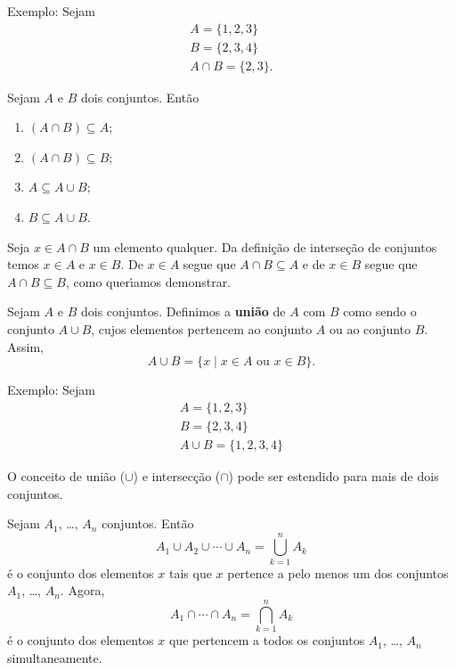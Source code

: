 Exemplo: Sejam
\begin{align*}
	A = \{1,2,3\}\\
	B = \{2,3,4\}\\
	A \cap B = \{2,3\}.
\end{align*}

\begin{proposicao} Sejam $A$ e $B$ dois conjuntos. Ent{\~a}o
\begin{enumerate}
\item $(A \cap B) \subseteq A$;
\item $(A \cap B) \subseteq B$;
\item $A \subseteq A \cup B$;
\item $B \subseteq A \cup B$.
\end{enumerate}
\end{proposicao}
\begin{prova}
	Seja $x \in A \cap B$ um elemento qualquer. Da defini\c{c}\~ao de interse\c{c}\~ao de conjuntos temos $x \in A$ e $x \in B$. De $x \in A$ segue que $A \cap B \subseteq A$ e de $x \in B$ segue que $A \cap B \subseteq B$, como quer{\'\i}amos demonstrar.
\end{prova}

\begin{definicao}[Uni{\~a}o]
Sejam $A$ e $B$ dois conjuntos. Definimos a \textbf{uni{\~a}o} de $A$ com $B$ como sendo o conjunto $A \cup B$, cujos elementos pertencem ao conjunto $A$ ou ao conjunto $B$. Assim,
\[
A \cup B = \{x \mid x \in A \mbox{ ou } x \in B\}.
\]
\end{definicao}

Exemplo: Sejam
\begin{align*}
	A = \{1,2,3\}\\
	B = \{2,3,4\}\\
	A \cup B = \{1,2,3,4\}
\end{align*}

O conceito de uni{\~a}o ($ \cup $) e intersec{\c c}{\~a}o ($ \cap $) pode ser estendido para mais de dois conjuntos.

\begin{definicao}
Sejam $A_{1}$, \dots, $A_{n}$ conjuntos. Ent{\~a}o
\[
A_{1} \cup A_{2} \cup \cdots \cup A_{n}= \displaystyle\bigcup_{k=1}^n A_{k}
\]
{\'e} o conjunto dos elementos $x$ tais que $x$ pertence a pelo menos um dos conjuntos $A_{1}$, \dots, $A_{n}$. Agora,
\[
A_{1} \cap \cdots \cap A_{n} = \displaystyle\bigcap_{k=1}^{n}A_{k}
\]
{\'e} o conjunto dos elementos $x$ que pertencem a todos os conjuntos $A_{1}$, \dots, $A_{n}$ simultaneamente.
\end{definicao}

